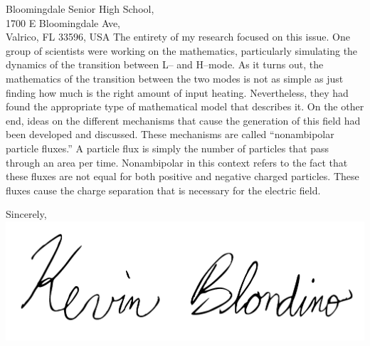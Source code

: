 \documentclass[12pt,a4paper]{letter}
\makeatletter
\renewcommand{\closing}[1]{\par\nobreak\vspace{\parskip}%
	\stopbreaks
		\noindent
	\ifx\@empty\fromaddress\else
		\hspace*{\longindentation}\fi
	\parbox{\indentedwidth}{\raggedright
			\ignorespaces #1\\[1\medskipamount]%
			\ifx\@empty\fromsig
				\fromname
			\else \fromsig \fi\strut}%
		\par}
\makeatother
\begin{document}
\begin{letter}{
	Bloomingdale Senior High School,\\
	1700 E Bloomingdale Ave,\\
	Valrico, FL 33596, USA
}
The entirety of my research focused on this issue.
One group of scientists were working on the mathematics, particularly simulating the dynamics of the transition between L-- and H--mode.
As it turns out, the mathematics of the transition between the two modes is not as simple as just finding how much is the right amount of input heating.
Nevertheless, they had found the appropriate type of mathematical model that describes it.
On the other end, ideas on the different mechanisms that cause the generation of this field had been developed and discussed.
These mechanisms are called ``nonambipolar particle fluxes.''
A particle flux is simply the number of particles that pass through an area per time.
Nonambipolar in this context refers to the fact that these fluxes are not equal for both positive and negative charged particles.
These fluxes cause the charge separation that is necessary for the electric field.

\vspace*{10mm}

\closing{Sincerely,
\includegraphics[scale=0.35]{./Signature_Cropped.pdf}}


\end{letter}
\end{document}
